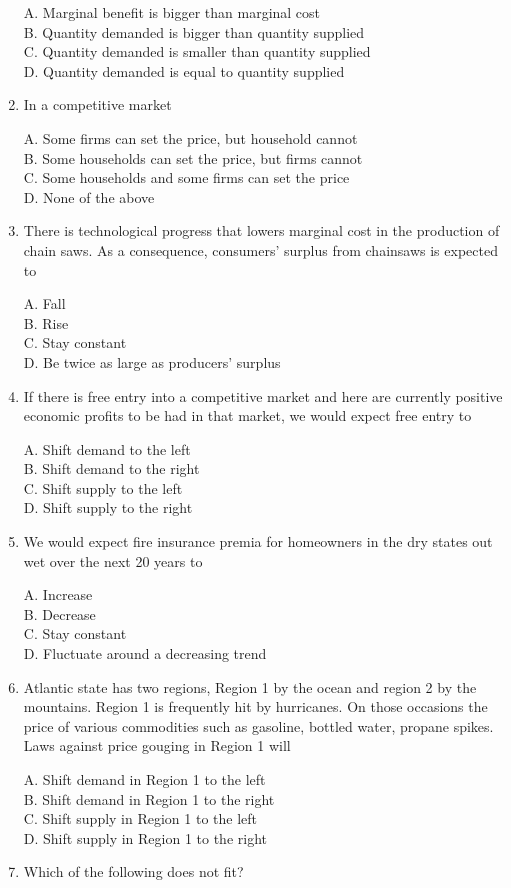 \documentclass[
]{book}
\begin{document}
\begin{enumerate}
  A. Marginal benefit is bigger than marginal cost\\
  B. Quantity demanded is bigger than quantity supplied\\
  C. Quantity demanded is smaller than quantity supplied\\
  D. Quantity demanded is equal to quantity supplied
\item
  In a competitive market

  A. Some firms can set the price, but household cannot\\
  B. Some households can set the price, but firms cannot\\
  C. Some households and some firms can set the price\\
  D. None of the above
\item
  There is technological progress that lowers marginal cost in the production of chain saws. As a consequence, consumers' surplus from chainsaws is expected to

  A. Fall\\
  B. Rise\\
  C. Stay constant\\
  D. Be twice as large as producers' surplus
\item
  If there is free entry into a competitive market and here are currently positive economic profits to be had in that market, we would expect free entry to

  A. Shift demand to the left\\
  B. Shift demand to the right\\
  C. Shift supply to the left\\
  D. Shift supply to the right
\item
  We would expect fire insurance premia for homeowners in the dry states out wet over the next 20 years to

  A. Increase\\
  B. Decrease\\
  C. Stay constant\\
  D. Fluctuate around a decreasing trend
\item
  Atlantic state has two regions, Region 1 by the ocean and region 2 by the mountains. Region 1 is frequently hit by hurricanes. On those occasions the price of various commodities such as gasoline, bottled water, propane spikes. Laws against price gouging in Region 1 will

  A. Shift demand in Region 1 to the left\\
  B. Shift demand in Region 1 to the right\\
  C. Shift supply in Region 1 to the left\\
  D. Shift supply in Region 1 to the right
\item
  Which of the following does not fit?


\end{enumerate}
\end{document}
